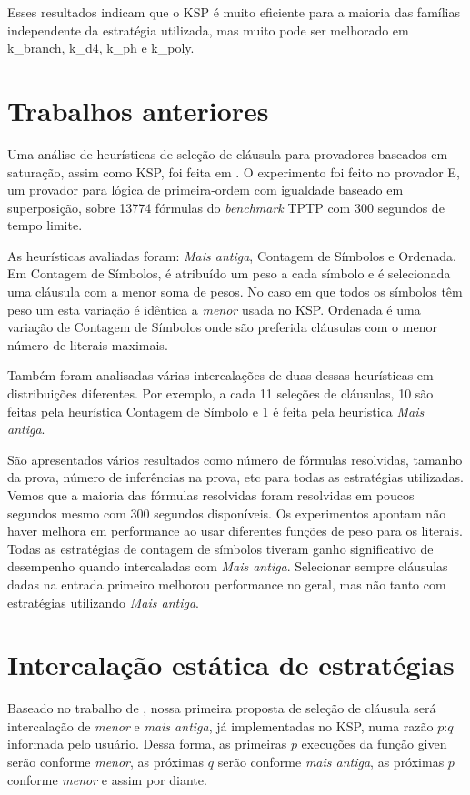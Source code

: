 Esses resultados indicam que o KSP é muito eficiente para a maioria das famílias independente da estratégia utilizada, mas muito pode ser melhorado em k\_branch, k\_d4, k\_ph e k\_poly.

\section{Trabalhos anteriores}
Uma análise de heurísticas de seleção de cláusula para provadores baseados em saturação, assim como KSP, foi feita em \cite{stephan}. O experimento foi feito no provador E, um provador para lógica de primeira-ordem com igualdade baseado em superposição, sobre 13774 fórmulas do \textit{benchmark} TPTP \cite{TPTP} com 300 segundos de tempo limite.

As heurísticas avaliadas foram: \textit{Mais antiga}, Contagem de Símbolos e Ordenada.%
 Em Contagem de Símbolos, é atribuído um peso a cada símbolo e é selecionada uma cláusula com a menor soma de pesos. No caso em que todos os símbolos têm peso um esta variação é idêntica a \textit{menor} usada no KSP. Ordenada é uma variação de Contagem de Símbolos onde são preferida cláusulas com o menor número de literais maximais.

Também foram analisadas várias intercalações de duas dessas heurísticas em distribuições diferentes. Por exemplo, a cada 11 seleções de cláusulas, 10 são feitas pela heurística Contagem de Símbolo e 1 é feita pela heurística \textit{Mais antiga}.

São apresentados vários resultados como número de fórmulas resolvidas, tamanho da prova, número de inferências na prova, etc para todas as estratégias utilizadas. Vemos que a maioria das fórmulas resolvidas foram resolvidas em poucos segundos mesmo com 300 segundos disponíveis. Os experimentos apontam não haver melhora em performance ao usar diferentes funções de peso para os literais. Todas as estratégias de contagem de símbolos tiveram ganho significativo de desempenho quando intercaladas com \textit{Mais antiga}. Selecionar sempre cláusulas dadas na entrada primeiro melhorou performance no geral, mas não tanto com estratégias utilizando \textit{Mais antiga}.

\section{Intercalação estática de estratégias} \label{secao:1proposta}
Baseado no trabalho de \cite{stephan}, nossa primeira proposta de seleção de cláusula será intercalação de \textit{menor} e \textit{mais antiga}, já implementadas no KSP, numa razão $p$:$q$ informada pelo usuário. Dessa forma, as primeiras $p$ execuções da função {\sf given} serão conforme \textit{menor}, as próximas $q$ serão conforme \textit{mais antiga}, as próximas $p$ conforme \textit{menor} e assim por diante.

